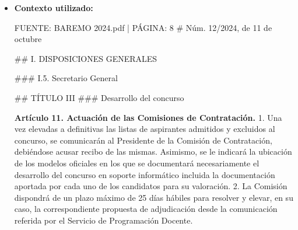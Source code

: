 \documentclass{article}
\begin{document}
\begin{itemize}
\begin{itemize}
                En cuanto a la experiencia investigadora, el baremo establece que el mérito preferente para el Profesorado Interino se logra con 5 puntos, que pueden ser obtenidos por habilitación, acreditación o ser funcionario en el cuerpo docente de Titular de Universidad o Catedrático de Universidad, o por estancias de investigación en universidades u otros centros de investigación externos a la Universidad de Sevilla.

                No obstante, no se establece expresamente que obtener más de 0 puntos en la experiencia investigadora sea un requisito estrictamente excluyente para el Profesor Sustituto Interino. Lo que sí se establece es que el umbral mínimo de 20 puntos (o 5 puntos en caso de acuerdo del Consejo de Departamento) debe ser superado para poder ser propuesto para la adjudicación de la plaza.

                En consecuencia, aunque la experiencia investigadora es un mérito valorable en el proceso de selección, no es un requisito estrictamente excluyente que deba ser superado con una puntuación mayor que 0. Lo que realmente importa es alcanzar el umbral mínimo establecido para el Profesorado Interino, que puede variar según las circunstancias.

                Por lo tanto, la respuesta a la pregunta del usuario es que no es un requisito estrictamente excluyente sacar más de 0 puntos en la experiencia investigadora para el Profesor Sustituto Interino, siempre y cuando se supere el umbral mínimo establecido.
          \item \textbf{Contexto utilizado:}
                \begin{scriptsize}
                  FUENTE: BAREMO 2024.pdf | PÁGINA: 8
                  \# Núm. 12/2024, de 11 de octubre

                  \#\# I. DISPOSICIONES GENERALES

                  \#\#\# I.5. Secretario General

                  \#\# TÍTULO III
                  \#\#\# Desarrollo del concurso

                  \textbf{Artículo 11. Actuación de las Comisiones de Contratación.}
                  1. Una vez elevadas a definitivas las listas de aspirantes admitidos y excluidos al concurso, se comunicarán al Presidente de la Comisión de Contratación, debiéndose acusar recibo de las mismas. Asimismo, se le indicará la ubicación de los modelos oficiales en los que se documentará necesariamente el desarrollo del concurso en soporte informático incluida la documentación aportada por cada uno de los candidatos para su valoración.
                  2. La Comisión dispondrá de un plazo máximo de 25 días hábiles para resolver y elevar, en su caso, la correspondiente propuesta de adjudicación desde la comunicación referida por el Servicio de Programación Docente.


\end{scriptsize}
\end{itemize}
\end{itemize}
\end{document}
